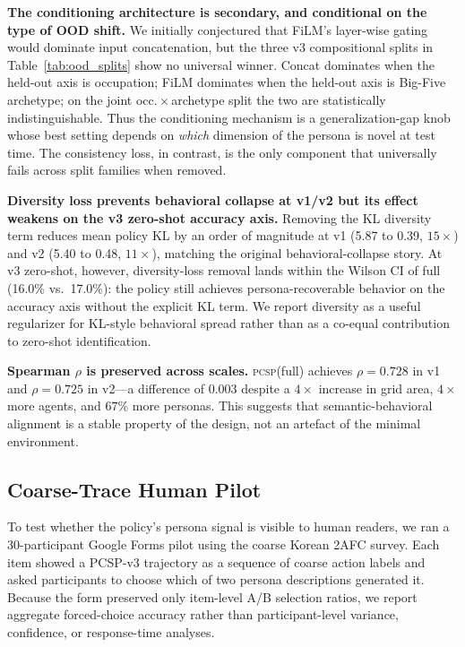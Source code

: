 \documentclass[conference]{IEEEtran}
\newcommand{\PCSP}{\textsc{pcsp}\xspace}
\begin{document}
\textbf{The conditioning architecture is secondary, and conditional on the
type of OOD shift.}
We initially conjectured that FiLM's layer-wise gating would dominate input
concatenation, but the three v3 compositional splits in
Table~\ref{tab:ood_splits} show no universal winner. Concat dominates when
the held-out axis is occupation; FiLM dominates when the held-out axis is
Big-Five archetype; on the joint occ.\,$\times$\,archetype split the two are
statistically indistinguishable. Thus the conditioning mechanism is a
generalization-gap knob whose best setting depends on \emph{which} dimension
of the persona is novel at test time. The consistency loss, in contrast, is
the only component that universally fails across split families when removed.

\textbf{Diversity loss prevents behavioral collapse at v1/v2 but its effect
weakens on the v3 zero-shot accuracy axis.}
Removing the KL diversity term reduces mean policy KL by an order of
magnitude at v1 (5.87 to 0.39, $15\times$) and v2 (5.40 to 0.48, $11\times$),
matching the original behavioral-collapse story.
At v3 zero-shot, however, diversity-loss removal lands within the Wilson CI
of full (16.0\% vs.\ 17.0\%): the policy still achieves persona-recoverable
behavior on the accuracy axis without the explicit KL term.
We report diversity as a useful regularizer for KL-style behavioral spread
rather than as a co-equal contribution to zero-shot identification.

\textbf{Spearman $\rho$ is preserved across scales.}
\PCSP (full) achieves $\rho\!=\!0.728$ in v1 and $\rho\!=\!0.725$ in v2---a
difference of 0.003 despite a $4\times$ increase in grid area, $4\times$ more
agents, and $67\%$ more personas. This suggests that semantic-behavioral
alignment is a stable property of the design, not an artefact of the
minimal environment.

\subsection{Coarse-Trace Human Pilot}
\label{sec:humanpilot}

To test whether the policy's persona signal is visible to human readers, we ran
a 30-participant Google Forms pilot using the coarse Korean 2AFC survey. Each
item showed a PCSP-v3 trajectory as a sequence of coarse action labels and asked
participants to choose which of two persona descriptions generated it. Because
the form preserved only item-level A/B selection ratios, we report aggregate
forced-choice accuracy rather than participant-level variance, confidence, or
response-time analyses.
\end{document}
